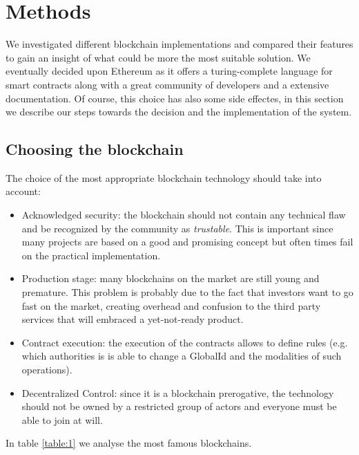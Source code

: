 \section{Methods}
\label{S:4}

We investigated different blockchain implementations and compared their features to gain an insight of what could be more the most suitable solution. We eventually decided upon Ethereum as it offers a turing-complete language for smart contracts along with a great community of developers and a extensive documentation. Of course, this choice has also some side effectes, in this section we describe our steps towards the decision and the implementation of the system.  

\subsection{Choosing the blockchain}

The choice of the most appropriate blockchain technology should take into account:
\begin{itemize}
  \item Acknowledged security: the blockchain should not contain any technical flaw and be recognized by the community as \textit{trustable}. This is important since many projects are based on a good and promising concept but often times fail on the practical implementation.
  \item Production stage: many blockchains on the market are still young and premature. This problem is probably due to the fact that investors want to go fast on the market, creating overhead and confusion to the third party services that will embraced a yet-not-ready product.
  \item Contract execution: the execution of the contracts allows to define rules (e.g. which authorities is is able to change a GlobalId and the modalities of such operations).
  \item Decentralized Control: since it is a blockchain prerogative, the technology should not be owned by a restricted group of actors and everyone must be able to join at will.
\end{itemize}

In table \ref{table:1} we analyse the most famous blockchains.

